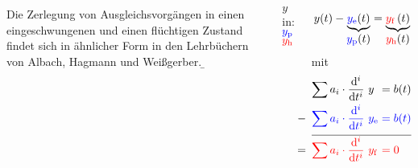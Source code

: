 \begin{frame}
\begin{columns}
{    %
    Die Zerlegung von Ausgleichsvorgängen in einen eingeschwungenen und einen flüchtigen Zustand 
    findet sich in ähnlicher Form in den Lehrbüchern von Albach\cite{albach}, Hagmann\cite{hagmann} und Weißgerber\cite{weissgerber3}.  
}%
\b{%
     $y$ in:\\
     ${\color{blue}y_{\mathrm{p}}}$\\
     ${\color{red}y_{\mathrm{h}}}$

    \begin{equation*}
        y(t) - 
        \underbrace{
            \ecb{y_{\mathrm{e}}}(t)
        }_{\displaystyle \ecb{y_{\mathrm{p}}}(t)}
        = \underbrace{
            \ecr{y_{\mathrlap{\mathrm{f}}\hphantom{h}}}(t)
        }_{\displaystyle \ecr{y_{\mathrm{h}}}(t)} 
    \end{equation*}%
    \pause%
    \qquad mit
    \begin{equation*}\begin{aligned}%
    \begin{split}
        \sum a_i\cdot \dt[i]\ y_{\hphantom{e}} &= b(t) \\
    \mathllap{\huge\mathbf - \hspace{5pt}} 
        \ec[blue]{\sum a_i \cdot \dt[i]\ y_{\mathrlap{\mathrm{e}}\hphantom{e}}} &\ec[blue]{{}= b(t)}\\[+5pt]
    \hline\\[-15pt]
    \mathllap{\huge\mathbf = \hspace{5pt}} 
        \ec[red]{\sum a_i \cdot \dt[i]\ y_{\mathrlap{\mathrm{f}}\hphantom{e}}} &\ec[red]{{}= 0}
    \end{split}\end{aligned}
    \end{equation*}
}%
\end{columns}
\end{frame}


